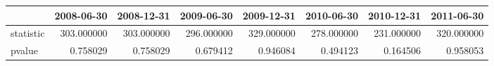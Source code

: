 \begin{tabular}{lrrrrrrr}
\toprule
{} &  2008-06-30 &  2008-12-31 &  2009-06-30 &  2009-12-31 &  2010-06-30 &  2010-12-31 &  2011-06-30 \\
\midrule
statistic &  303.000000 &  303.000000 &  296.000000 &  329.000000 &  278.000000 &  231.000000 &  320.000000 \\
pvalue    &    0.758029 &    0.758029 &    0.679412 &    0.946084 &    0.494123 &    0.164506 &    0.958053 \\
\bottomrule
\end{tabular}
